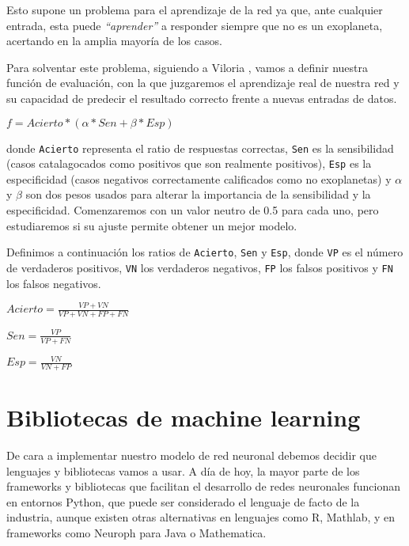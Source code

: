 Esto supone un problema para el aprendizaje de la red ya que, ante
cualquier entrada, esta puede \emph{``aprender''} a responder siempre
que no es un exoplaneta, acertando en la amplia mayoría de los casos.

Para solventar este problema, siguiendo a Viloria \cite{Viloria-2006}, vamos a
definir nuestra función de evaluación, con la que juzgaremos el
aprendizaje real de nuestra red y su capacidad de predecir el resultado
correcto frente a nuevas entradas de datos.

\begin{math}
f = Acierto * (\alpha * Sen + \beta * Esp)
\end{math}

donde \texttt{Acierto} representa el ratio de respuestas correctas,
\texttt{Sen} es la sensibilidad (casos catalagocados como positivos
que son realmente positivos), \texttt{Esp} es la especificidad
(casos negativos correctamente calificados como no exoplanetas) y
\(\alpha\) y \(\beta\) son dos pesos usados para alterar la importancia de la sensibilidad y la
especificidad. Comenzaremos con un valor neutro de 0.5 para cada uno,
pero estudiaremos si su ajuste permite obtener un mejor modelo.

Definimos a continuación los ratios de \texttt{Acierto},
\texttt{Sen} y \texttt{Esp}, donde \texttt{VP} es el número
de verdaderos positivos, \texttt{VN} los verdaderos negativos,
\texttt{FP} los falsos positivos y \texttt{FN} los falsos
negativos.

\begin{math}
Acierto = \frac{VP + VN}{VP + VN + FP + FN}
\end{math}

\begin{math}
Sen = \frac{VP}{VP + FN}
\end{math}

\begin{math}
Esp = \frac{VN}{VN + FP}
\end{math}

\section{Bibliotecas de machine learning}\label{sec:bibliotecas-de-machine-learning}

De cara a implementar nuestro modelo de red neuronal debemos decidir que
lenguajes y bibliotecas vamos a usar. A día de hoy, la mayor parte de los
frameworks y bibliotecas que facilitan el desarrollo de redes neuronales
funcionan en entornos Python, que puede ser considerado el lenguaje de
facto de la industria, aunque existen otras alternativas en lenguajes
como R, Mathlab, y en frameworks como Neuroph para Java o Mathematica.

